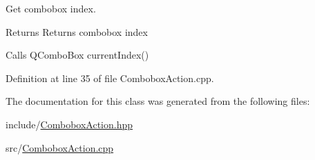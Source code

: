 Get combobox index. 

\begin{DoxyReturn}{Returns}
Returns combobox index
\end{DoxyReturn}
Calls Q\+Combo\+Box current\+Index() 

Definition at line 35 of file Combobox\+Action.\+cpp.



The documentation for this class was generated from the following files\+:\begin{DoxyCompactItemize}
\item 
include/\mbox{\hyperlink{ComboboxAction_8hpp}{Combobox\+Action.\+hpp}}\item 
src/\mbox{\hyperlink{ComboboxAction_8cpp}{Combobox\+Action.\+cpp}}\end{DoxyCompactItemize}
